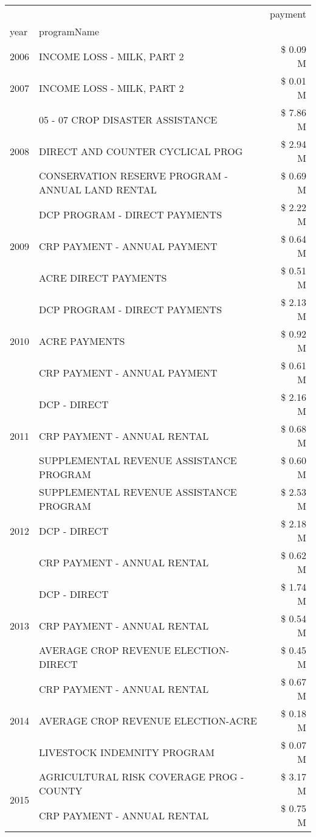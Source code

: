 \begin{tabular}{llr}
\toprule
 &  & payment \\
year & programName &  \\
\midrule
2006 & INCOME LOSS - MILK, PART 2 & \$ 0.09 M \\
\cline{1-3}
2007 & INCOME LOSS - MILK, PART 2 & \$ 0.01 M \\
\cline{1-3}
\multirow[t]{3}{*}{2008} & 05 - 07 CROP DISASTER ASSISTANCE & \$ 7.86 M \\
 & DIRECT AND COUNTER CYCLICAL PROG & \$ 2.94 M \\
 & CONSERVATION RESERVE PROGRAM - ANNUAL LAND RENTAL & \$ 0.69 M \\
\cline{1-3}
\multirow[t]{3}{*}{2009} & DCP PROGRAM - DIRECT PAYMENTS & \$ 2.22 M \\
 & CRP PAYMENT - ANNUAL PAYMENT & \$ 0.64 M \\
 & ACRE DIRECT PAYMENTS & \$ 0.51 M \\
\cline{1-3}
\multirow[t]{3}{*}{2010} & DCP PROGRAM - DIRECT PAYMENTS & \$ 2.13 M \\
 & ACRE PAYMENTS & \$ 0.92 M \\
 & CRP PAYMENT - ANNUAL PAYMENT & \$ 0.61 M \\
\cline{1-3}
\multirow[t]{3}{*}{2011} & DCP - DIRECT & \$ 2.16 M \\
 & CRP PAYMENT - ANNUAL RENTAL & \$ 0.68 M \\
 & SUPPLEMENTAL REVENUE ASSISTANCE PROGRAM & \$ 0.60 M \\
\cline{1-3}
\multirow[t]{3}{*}{2012} & SUPPLEMENTAL REVENUE ASSISTANCE PROGRAM & \$ 2.53 M \\
 & DCP - DIRECT & \$ 2.18 M \\
 & CRP PAYMENT - ANNUAL RENTAL & \$ 0.62 M \\
\cline{1-3}
\multirow[t]{3}{*}{2013} & DCP - DIRECT & \$ 1.74 M \\
 & CRP PAYMENT - ANNUAL RENTAL & \$ 0.54 M \\
 & AVERAGE CROP REVENUE ELECTION-DIRECT & \$ 0.45 M \\
\cline{1-3}
\multirow[t]{3}{*}{2014} & CRP PAYMENT - ANNUAL RENTAL & \$ 0.67 M \\
 & AVERAGE CROP REVENUE ELECTION-ACRE & \$ 0.18 M \\
 & LIVESTOCK INDEMNITY PROGRAM & \$ 0.07 M \\
\cline{1-3}
\multirow[t]{3}{*}{2015} & AGRICULTURAL RISK COVERAGE PROG - COUNTY & \$ 3.17 M \\
 & CRP PAYMENT - ANNUAL RENTAL & \$ 0.75 M \\

\end{tabular}
